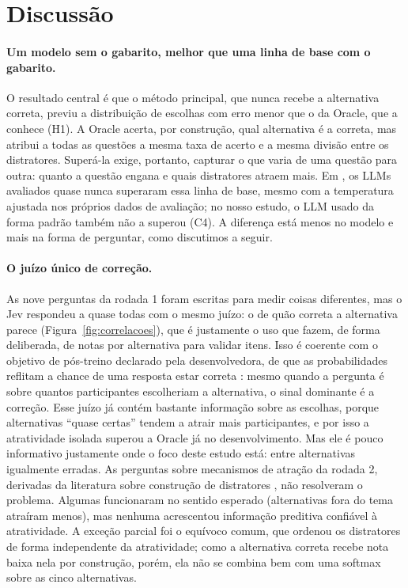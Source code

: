 
\section{Discussão}\label{sec:discussao}

\paragraph{Um modelo sem o gabarito, melhor que uma linha de base com o gabarito.} O resultado central é que o método principal, que nunca recebe a alternativa correta, previu a distribuição de escolhas com erro menor que o da Oracle, que a conhece (H1). A Oracle acerta, por construção, qual alternativa é a correta, mas atribui a todas as questões a mesma taxa de acerto e a mesma divisão entre os distratores. Superá-la exige, portanto, capturar o que varia de uma questão para outra: quanto a questão engana e quais distratores atraem mais. Em \citet{saeuberli2025}, os LLMs avaliados quase nunca superaram essa linha de base, mesmo com a temperatura ajustada nos próprios dados de avaliação; no nosso estudo, o LLM usado da forma padrão também não a superou (C4). A diferença está menos no modelo e mais na forma de perguntar, como discutimos a seguir.

\paragraph{O juízo único de correção.} As nove perguntas da rodada 1 foram escritas para medir coisas diferentes, mas o Jev respondeu a quase todas com o mesmo juízo: o de quão correta a alternativa parece (Figura~\ref{fig:correlacoes}), que é justamente o uso que \citet{mucciaccia2025} fazem, de forma deliberada, de notas por alternativa para validar itens. Isso é coerente com o objetivo de pós-treino declarado pela desenvolvedora, de que as probabilidades reflitam a chance de uma resposta estar correta \citep{typesafe2026docs}: mesmo quando a pergunta é sobre quantos participantes escolheriam a alternativa, o sinal dominante é a correção. Esse juízo já contém bastante informação sobre as escolhas, porque alternativas ``quase certas'' tendem a atrair mais participantes, e por isso a atratividade isolada superou a Oracle já no desenvolvimento. Mas ele é pouco informativo justamente onde o foco deste estudo está: entre alternativas igualmente erradas. As perguntas sobre mecanismos de atração da rodada 2, derivadas da literatura sobre construção de distratores \citep{nagai2025,lee2025,benedetto2025}, não resolveram o problema. Algumas funcionaram no sentido esperado (alternativas fora do tema atraíram menos), mas nenhuma acrescentou informação preditiva confiável à atratividade. A exceção parcial foi o equívoco comum, que ordenou os distratores de forma independente da atratividade; como a alternativa correta recebe nota baixa nela por construção, porém, ela não se combina bem com uma softmax sobre as cinco alternativas.

